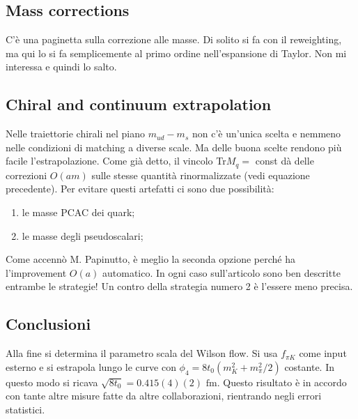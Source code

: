 \documentclass[12pt,a4paper,openright]{article}
\newcommand{\fm}{\text{ fm}}
\begin{document}
\subsection{Mass corrections}
C'è una paginetta sulla correzione alle masse. Di solito si fa con il reweighting, ma qui lo si fa semplicemente al primo ordine nell'espansione di Taylor.
Non mi interessa e quindi lo salto.

\subsection{Chiral and continuum extrapolation}
Nelle traiettorie chirali nel piano $m_{ud} - m_s$ non c'è un'unica scelta e nemmeno nelle condizioni di matching a diverse scale. Ma delle buona scelte rendono più facile l'estrapolazione.
\newline
Come già detto, il vincolo Tr$M_q = $ const dà delle correzioni $O(am)$ sulle stesse quantità rinormalizzate (vedi equazione precedente).
Per evitare questi artefatti ci sono due possibilità:
\begin{enumerate}
  \item le masse PCAC dei quark;
  \item le masse degli pseudoscalari;
\end{enumerate}
Come accennò M. Papinutto, è meglio la seconda opzione perché ha l'improvement $O(a)$ automatico.
In ogni caso sull'articolo sono ben descritte entrambe le strategie!
Un contro della strategia numero 2 è l'essere meno precisa.

\subsection{Conclusioni} 
Alla fine si determina il parametro scala del Wilson flow. Si usa $f_{\pi K}$ come input esterno e si estrapola lungo le curve con $\phi_4 = {8 t_0}\left( m_K^2 + m_\pi^2/2 \right) $ costante.
In questo modo si ricava $\sqrt{8t_0} = 0.415(4)(2)\fm$. Questo risultato è in accordo con tante altre misure fatte da altre collaborazioni, rientrando negli errori statistici.

\newpage
\end{document}

